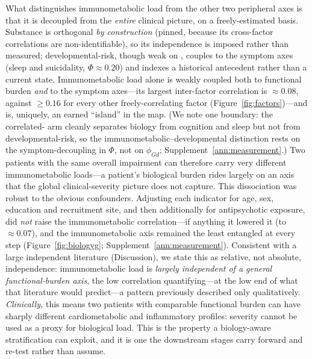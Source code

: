 What distinguishes immunometabolic load from the other two peripheral axes is that it is
decoupled from the \emph{entire} clinical picture, on a freely-estimated basis. Substance
is orthogonal \emph{by construction} (pinned, because its cross-factor correlations are
non-identifiable), so its independence is imposed rather than measured; developmental-risk,
though weak on \Gfac{}, couples to the symptom axes (sleep and suicidality,
$\Phi\approx 0.20$) and indexes a historical antecedent rather than a current state.
Immunometabolic load alone is weakly coupled both to functional burden \emph{and} to the
symptom axes---its largest inter-factor correlation is $\approx 0.08$, against $\ge 0.16$
for every other freely-correlating factor (Figure~\ref{fig:factors})---and is, uniquely, an
earned ``island'' in the map. (We note one boundary: the correlated-\Gfac{} arm cleanly
separates biology from cognition and sleep but not from developmental-risk, so the
immunometabolic--developmental distinction rests on the symptom-decoupling in $\Phi$, not on
$\phi_{Gd}$; Supplement~\ref{ann:measurement}.) Two patients with the same overall
impairment can therefore carry very different immunometabolic loads---a patient's biological
burden rides largely on an axis that the global clinical-severity picture does not capture.
This dissociation was robust to the obvious
confounders. Adjusting each indicator for age, sex, education and recruitment site, and
then additionally for antipsychotic exposure, did \emph{not} raise the immunometabolic
correlation---if anything it lowered it (to $\approx 0.07$), and the immunometabolic axis
remained the least entangled at every step (Figure~\ref{fig:biologyg};
Supplement~\ref{ann:measurement}). Consistent with a large independent literature
(Discussion), we state this as relative, not absolute, independence: immunometabolic load
is \emph{largely independent of a general functional-burden axis}, the low correlation
quantifying---at the low end of what that literature would predict---a pattern previously
described only qualitatively. \emph{Clinically,} this means two patients with comparable
functional burden can have sharply different cardiometabolic and inflammatory profiles:
severity cannot be used as a proxy for biological load. This is the property a
biology-aware stratification can exploit, and it is one the downstream stages
carry forward and re-test rather than assume.

